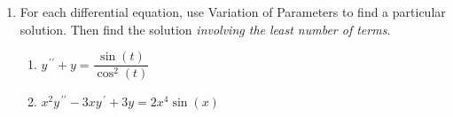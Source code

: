 \documentclass{ximera}
\begin{document}
\begin{enumerate}

\item  For each differential equation, use Variation of Parameters to find a particular solution.  Then find the solution \emph{involving the least number of terms}.


\begin{enumerate}

\bigskip

\item $y^{\,\prime\prime}+y=\dfrac{\sin{(t)}}{\cos^2{(t)}}$












\vfill



\item $x^2 y^{\,\prime\prime}-3xy^{\,\prime}+3y=2x^4 \sin{(x)}$












\end{enumerate}
\end{enumerate}
\end{document}

